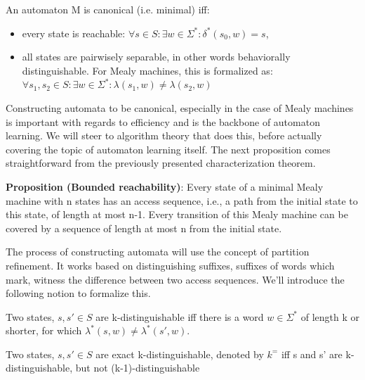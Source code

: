 \begin{definition}
	An automaton M is canonical (i.e. minimal) iff:
	\begin{itemize}
		\item every state is reachable: $\forall s\in S: \exists w\in\Sigma^*: \delta^*(s_0, w) = s$,
		\item all states are pairwisely separable, in other words behaviorally distinguishable. For Mealy machines, this is formalized as: $\forall s_1, s_2\in S: \exists w\in\Sigma^*: \lambda(s_1, w)\neq\lambda(s_2, w)$
	\end{itemize}
\end{definition}


Constructing automata to be canonical, especially in the case of Mealy machines is important with regards to efficiency and is the backbone of automaton learning. We will steer to algorithm theory that does this, before actually covering the topic of automaton learning itself. The next proposition comes straightforward from the previously presented characterization theorem.


\noindent \textbf{Proposition (Bounded reachability\cite{Steffen2011})}: Every state of a minimal Mealy machine with n states has an access sequence, i.e., a path from the initial state to this  state,  of  length  at  most n-1.  Every  transition  of  this  Mealy  machine  can be covered by a sequence of length at most n from the initial state.

The process of constructing automata will use the concept of partition refinement. It works based on distinguishing suffixes, suffixes of words which mark, witness the difference between two access sequences. We'll introduce the following notion to formalize this.


\begin{definition}
	Two states, $s,s'\in S$ are k-distinguishable iff there is a word $w\in\Sigma^*$ of length k or shorter, for which $\lambda^*(s, w)\neq\lambda^*(s',w)$.
\end{definition} 

\begin{definition}
	Two states, $s,s'\in S$ are exact k-distinguishable, denoted by $k^=$ iff s and s' are k-distinguishable, but not (k-1)-distinguishable
\end{definition}

